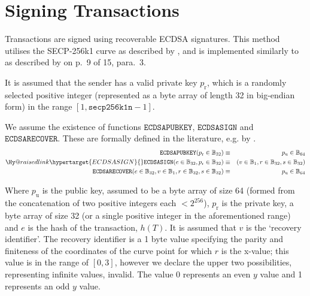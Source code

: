 \documentclass[9pt,oneside]{amsart}
\makeatletter
\newcommand{\linkdest}[1]{\Hy@raisedlink{\hypertarget{#1}{}}}
\newcommand*\eg{e.g.\@\xspace}
\makeatother
\begin{document}
\section{Signing Transactions}\label{app:signing}

Transactions are signed using recoverable ECDSA signatures. This method utilises the SECP-256k1 curve as described by \cite{Courtois2014}, and is implemented similarly to as described by \cite{gura2004comparing} on p.~9 of 15, para.~3.

It is assumed that the sender has a valid private key $p_{\mathrm{r}}$, which is a randomly selected positive integer (represented as a byte array of length 32 in big-endian form) in the range \hbox{$[1, \mathtt{secp256k1n} - 1]$}.

We assume the existence of functions $\mathtt{ECDSAPUBKEY}$, $\mathtt{ECDSASIGN}$ and $\mathtt{ECDSARECOVER}$. These are formally defined in the literature, \eg by \cite{ECDSAcerticom}.
\begin{eqnarray}
\mathtt{ECDSAPUBKEY}(p_{\mathrm{r}} \in \mathbb{B}_{32}) & \equiv & p_{\mathrm{u}} \in \mathbb{B}_{64} \\
\linkdest{ECDSASIGN}\mathtt{ECDSASIGN}(e \in \mathbb{B}_{32}, p_{\mathrm{r}} \in \mathbb{B}_{32}) & \equiv & (v \in \mathbb{B}_{1}, r \in \mathbb{B}_{32}, s \in \mathbb{B}_{32}) \\
\mathtt{ECDSARECOVER}(e \in \mathbb{B}_{32}, v \in \mathbb{B}_{1}, r \in \mathbb{B}_{32}, s \in \mathbb{B}_{32}) & \equiv & p_{\mathrm{u}} \in \mathbb{B}_{64}
\end{eqnarray}

Where $p_{\mathrm{u}}$ is the public key, assumed to be a byte array of size 64 (formed from the concatenation of two positive integers each $< 2^{256}$),
$p_{\mathrm{r}}$ is the private key, a byte array of size 32 (or a single positive integer in the aforementioned range) and $e$ is the hash of the transaction, \hyperlink{h_of_T}{$h(T)$}.
It is assumed that \hypertarget{v}{}$v$ is the `recovery identifier'.
The recovery identifier is a 1 byte value specifying the parity and finiteness of the coordinates of the curve point for which $r$ is the x-value; this value is in the range of $[0, 3]$, however we declare the upper two possibilities, representing infinite values, invalid.
The value 0 represents an even $y$ value and 1 represents an odd $y$ value.

\newcommand{\slimit}{\ensuremath{\text{s-limit}}}
\end{document}
